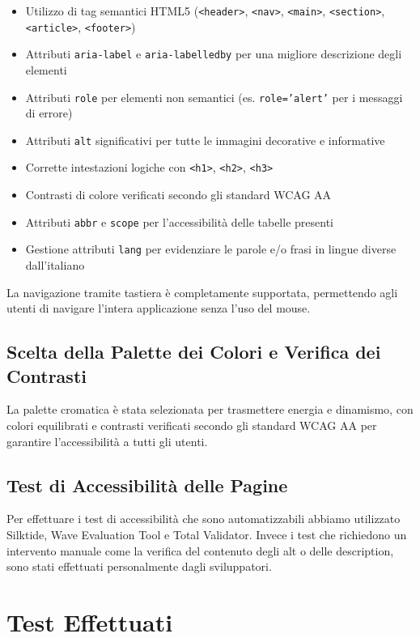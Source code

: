 \documentclass{article}
\begin{document}
\begin{itemize}
    \item Utilizzo di tag semantici HTML5 (\texttt{<header>}, \texttt{<nav>}, \texttt{<main>}, \texttt{<section>}, \texttt{<article>}, \texttt{<footer>})
    \item Attributi \texttt{aria-label} e \texttt{aria-labelledby} per una migliore descrizione degli elementi
    \item Attributi \texttt{role} per elementi non semantici (es. \texttt{role='alert'} per i messaggi di errore)
    \item Attributi \texttt{alt} significativi per tutte le immagini decorative e informative
    \item Corrette intestazioni logiche con \texttt{<h1>}, \texttt{<h2>}, \texttt{<h3>}
    \item Contrasti di colore verificati secondo gli standard WCAG AA
    \item Attributi \texttt{abbr} e \texttt{scope} per l'accessibilità delle tabelle presenti
    \item Gestione attributi \texttt{lang} per evidenziare le parole e/o frasi in lingue diverse dall'italiano
\end{itemize}

La navigazione tramite tastiera è completamente supportata, permettendo agli utenti di navigare l'intera applicazione senza l'uso del mouse.

\subsection{Scelta della Palette dei Colori e Verifica dei Contrasti}

La palette cromatica è stata selezionata per trasmettere energia e dinamismo, con colori equilibrati e contrasti verificati secondo gli standard WCAG AA per garantire l'accessibilità a tutti gli utenti.

\subsection{Test di Accessibilità delle Pagine}
Per effettuare i test di accessibilità che sono automatizzabili abbiamo utilizzato Silktide, Wave Evaluation Tool e Total Validator. Invece i test che richiedono un intervento manuale come la verifica del contenuto degli alt o delle description, sono stati effettuati personalmente dagli sviluppatori.  

\section{Test Effettuati}
\end{document}
